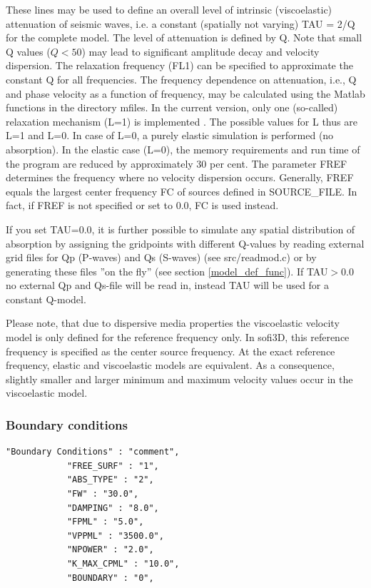 \documentclass[11pt,onecolumn,oneside]{article}
\begin{document}
These lines may be used to define an overall level of intrinsic (viscoelastic) attenuation of seismic waves, i.e. a constant (spatially not varying) TAU = 2/Q for the complete model. The level of attenuation is defined by Q. Note that small Q values ($Q<50$) may lead to significant amplitude decay and velocity dispersion. The relaxation frequency (FL1) can be specified to approximate the constant Q for all frequencies. The frequency dependence on attenuation, i.e., Q and phase velocity as a function  of frequency, may be calculated using the Matlab functions in the directory mfiles.
In the current version, only one (so-called) relaxation mechanism (L=1) is implemented \cite{bohlen:98,blanch:95,bohlen:02}. The possible values for L thus are L=1 and L=0. In case of L=0, a purely elastic simulation is performed (no absorption). In the elastic case (L=0), the memory requirements and run time of the program are reduced by approximately 30 per cent. The parameter FREF determines the frequency where no velocity dispersion occurs. Generally, FREF equals the largest center frequency FC of sources defined in SOURCE\_FILE. In fact, if FREF is not specified or set to 0.0, FC is used instead.

If you set TAU=0.0, it is further possible to simulate any spatial distribution of absorption by assigning the gridpoints with different Q-values by reading external grid files for Qp (P-waves) and Qs (S-waves) (see src/readmod.c) or by generating these files ''on the fly'' (see section \ref{model_def_func}). If TAU$>$0.0 no external Qp and Qs-file will be read in, instead TAU will be used for a constant Q-model.

Please note, that due to dispersive media properties the viscoelastic velocity model is only defined for the reference frequency only. In sofi3D, this reference frequency is specified as the center source frequency. At the exact reference frequency, elastic and viscoelastic models are equivalent. As a consequence, slightly smaller and larger minimum and maximum velocity values occur in the viscoelastic model.


\subsubsection{Boundary conditions}
\label{abs}

\begin{verbatim}
"Boundary Conditions" : "comment",
            "FREE_SURF" : "1", 
            "ABS_TYPE" : "2",
            "FW" : "30.0",
            "DAMPING" : "8.0",
            "FPML" : "5.0",
            "VPPML" : "3500.0",
            "NPOWER" : "2.0",
            "K_MAX_CPML" : "10.0",
            "BOUNDARY" : "0",
\end{verbatim}
\end{document}
